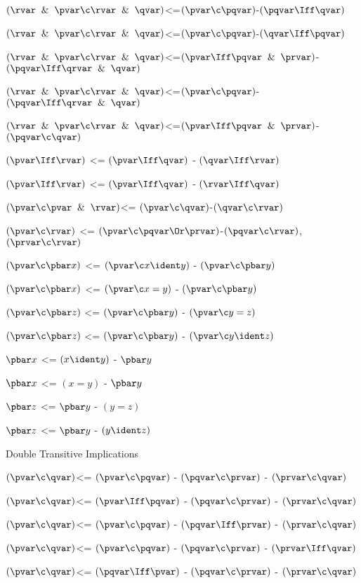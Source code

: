 $(\rvar \And \pvar \c \rvar \And \qvar)$<=$(\pvar \c \pqvar)$-$(\pqvar\Iff \qvar)$

$(\rvar \And \pvar \c \rvar \And \qvar)$<=$(\pvar \c \pqvar)$-$(\qvar\Iff \pqvar)$

$(\rvar \And \pvar \c \rvar \And \qvar)$<=$(\pvar \Iff \pqvar \And \prvar)$-$(\pqvar\Iff \qrvar \And \qvar)$

$(\rvar \And \pvar \c \rvar \And \qvar)$<=$(\pvar \c \pqvar)$-$(\pqvar\Iff \qrvar \And \qvar)$

$(\rvar \And \pvar \c \rvar \And \qvar)$<=$(\pvar \Iff \pqvar \And \prvar)$-$(\pqvar\c\qvar)$

$(\pvar \Iff \rvar)$ <= $(\pvar\Iff\qvar)$ - $(\qvar\Iff\rvar)$

$(\pvar \Iff \rvar)$ <= $(\pvar\Iff\qvar)$ - $(\rvar\Iff\qvar)$

$(\pvar \c \pvar\And \rvar)$<= $(\pvar \c \qvar)$-$(\qvar \c \rvar)$

$(\pvar \c \rvar)$ <= $(\pvar \c \pqvar \Or\prvar)$-$(\pqvar \c \rvar)$,$(\prvar \c \rvar)$
\lineb

$(\pvar \c \pbar x)$ <= $(\pvar \c x \ident y)$ - $(\pvar \c \pbar y)$

$(\pvar \c \pbar x)$ <= $(\pvar \c x = y)$ -  $(\pvar \c \pbar y)$

$(\pvar \c \pbar z)$ <= $(\pvar \c \pbar y)$ - $(\pvar \c y = z)$

$(\pvar \c \pbar z)$ <= $(\pvar \c \pbar y)$ - $(\pvar \c y \ident z)$

$\pbar x$ <= $(x \ident y)$ - $\pbar y$

$\pbar x$ <= $(x = y)$ -  $\pbar y$

$\pbar z$ <= $\pbar y$ - $(y = z)$

$\pbar z$ <= $\pbar y$ - $(y \ident z)$


Double Transitive Implications
\lineb


$(\pvar \c \qvar)$<= $(\pvar \c \pqvar)$ - $(\pqvar \c \prvar)$ - $(\prvar \c \qvar)$

$(\pvar \c \qvar)$<= $(\pvar \Iff \pqvar)$ - $(\pqvar \c \prvar)$ - $(\prvar \c \qvar)$

$(\pvar \c \qvar)$<= $(\pvar \c \pqvar)$ - $(\pqvar \Iff \prvar)$ - $(\prvar \c \qvar)$

$(\pvar \c \qvar)$<= $(\pvar \c \pqvar)$ - $(\pqvar \c \prvar)$ - $(\prvar \Iff \qvar)$

$(\pvar \c \qvar)$<= $(\pqvar \Iff \pvar)$ - $(\pqvar \c \prvar)$ - $(\prvar \c \qvar)$

